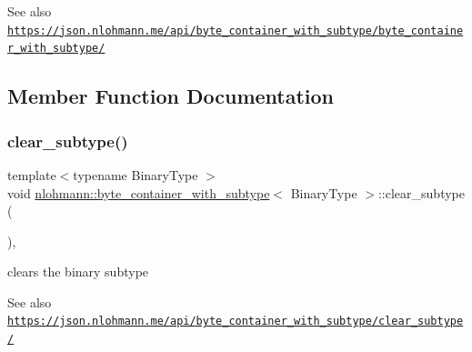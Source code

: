 \begin{DoxySeeAlso}{See also}
\href{https://json.nlohmann.me/api/byte_container_with_subtype/byte_container_with_subtype/}{\tt https\+://json.\+nlohmann.\+me/api/byte\+\_\+container\+\_\+with\+\_\+subtype/byte\+\_\+container\+\_\+with\+\_\+subtype/} 
\end{DoxySeeAlso}


\subsection{Member Function Documentation}
\mbox{\label{classnlohmann_1_1byte__container__with__subtype_a7b122b28ff2b8680557ca44ac9748e49}} 
\subsubsection{\texorpdfstring{clear\+\_\+subtype()}{clear\_subtype()}}
{\footnotesize\ttfamily template$<$typename Binary\+Type $>$ \\
void \hyperlink{classnlohmann_1_1byte__container__with__subtype}{nlohmann\+::byte\+\_\+container\+\_\+with\+\_\+subtype}$<$ Binary\+Type $>$\+::clear\+\_\+subtype (\begin{DoxyParamCaption}{ }\end{DoxyParamCaption})\hspace{0.3cm}{\ttfamily [inline]}, {\ttfamily [noexcept]}}



clears the binary subtype 

\begin{DoxySeeAlso}{See also}
\href{https://json.nlohmann.me/api/byte_container_with_subtype/clear_subtype/}{\tt https\+://json.\+nlohmann.\+me/api/byte\+\_\+container\+\_\+with\+\_\+subtype/clear\+\_\+subtype/} 
\end{DoxySeeAlso}
\mbox{\label{classnlohmann_1_1byte__container__with__subtype_a9fc42fb07003bf7048c2f1fc79478e02}} 
